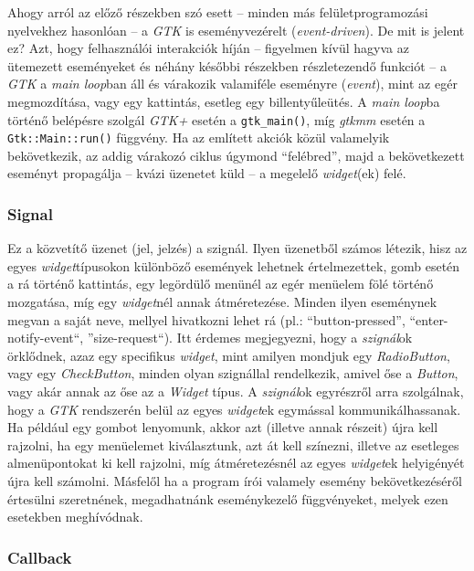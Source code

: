 \documentclass[a4paper,10pt]{article}
\begin{document}
Ahogy arról az előző részekben szó esett -- minden más felületprogramozási nyelvekhez hasonlóan -- a \textit{GTK} is eseményvezérelt (\textit{event-driven}). De mit is jelent ez?  Azt, hogy felhasználói interakciók híján -- figyelmen kívül hagyva az ütemezett eseményeket és néhány későbbi részekben részletezendő funkciót -- a \textit{GTK} a \textit{main loop}ban áll és várakozik valamiféle eseményre (\textit{event}), mint az egér megmozdítása, vagy egy kattintás, esetleg egy billentyűleütés. A \textit{main loop}ba történő belépésre szolgál \textit{GTK+} esetén a \texttt{gtk\_main()}, míg \textit{gtkmm} esetén a \texttt{Gtk::Main::run()} függvény. Ha az említett akciók közül valamelyik bekövetkezik, az addig várakozó ciklus úgymond ``felébred'', majd a bekövetkezett eseményt propagálja -- kvázi üzenetet küld -- a megelelő \textit{widget}(ek) felé.

\subsubsection{Signal}

Ez a közvetítő üzenet (jel, jelzés) a szignál. Ilyen üzenetből számos létezik, hisz az egyes \textit{widget}típusokon különböző események lehetnek értelmezettek, gomb esetén a rá történő kattintás, egy legördülő menünél az egér menüelem fölé történő mozgatása, míg egy \textit{widget}nél annak átméretezése. Minden ilyen eseménynek megvan a saját neve, mellyel hivatkozni lehet rá (pl.: ``button-pressed'', ``enter-notify-event``, ''size-request``). Itt érdemes megjegyezni, hogy a \textit{szignál}ok örklődnek, azaz egy specifikus \textit{widget}, mint amilyen mondjuk egy \textit{RadioButton}, vagy egy \textit{CheckButton}, minden olyan szignállal rendelkezik, amivel őse a \textit{Button}, vagy akár annak az őse az a \textit{Widget} típus. A \textit{szignál}ok egyrészről arra szolgálnak, hogy a \textit{GTK} rendszerén belül az egyes \textit{widget}ek egymással kommunikálhassanak. Ha például egy gombot lenyomunk, akkor azt (illetve annak részeit) újra kell rajzolni, ha egy menüelemet kiválasztunk, azt át kell színezni, illetve az esetleges almenüpontokat ki kell rajzolni, míg átméretezésnél az egyes \textit{widget}ek helyigényét újra kell számolni. Másfelől ha a program írói valamely esemény bekövetkezéséről értesülni szeretnének, megadhatnánk eseménykezelő függvényeket, melyek ezen esetekben meghívódnak.

\subsubsection{Callback}
\end{document}
